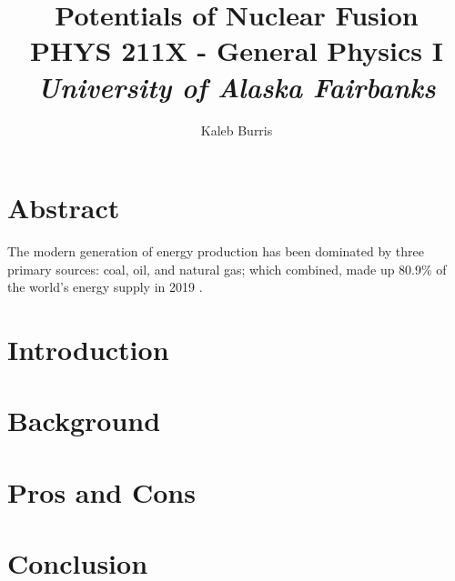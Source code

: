 \documentclass[12pt]{article}
\title{
    \textbf{Potentials of Nuclear Fusion} 
    \\
    \vspace{0.5cm}
    \large PHYS 211X - General Physics I
    \\
    \emph{University of Alaska Fairbanks}
}
\date{}
\author{
    Kaleb Burris
}
\begin{document}
    \maketitle

    \thispagestyle{plain}

    \section{Abstract}

    The modern generation of energy production has been dominated by three primary sources: coal, oil, and natural gas; which combined, made up 80.9\% of the world's energy supply in 2019 \citep[Supply]{KWES}.

    \pagebreak

    \section{Introduction}

    \lipsum[3-5]

    \pagebreak

    \section{Background}

    \lipsum[6-9]

    \pagebreak

    \section{Pros and Cons}

    \lipsum[10-14]

    \pagebreak

    \section{Conclusion}

    \lipsum[15-19]

    \pagebreak

    \pagestyle{empty}

    

    
\end{document}
